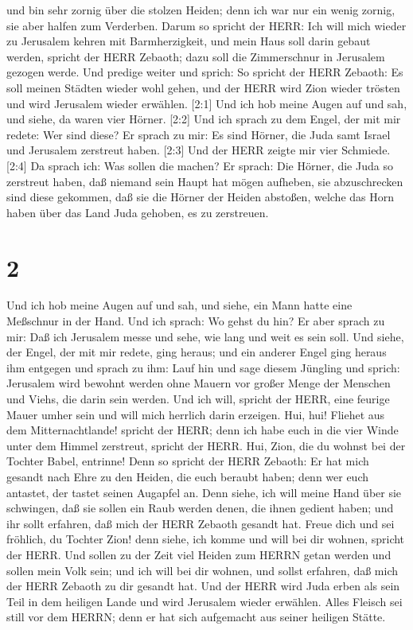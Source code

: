  und bin sehr zornig über die stolzen Heiden; denn ich war
nur ein wenig zornig, sie aber halfen zum Verderben.  Darum
so spricht der HERR: Ich will mich wieder zu Jerusalem kehren mit
Barmherzigkeit, und mein Haus soll darin gebaut werden, spricht der HERR
Zebaoth; dazu soll die Zimmerschnur in Jerusalem gezogen werde.
 Und predige weiter und sprich: So spricht der HERR
Zebaoth: Es soll meinen Städten wieder wohl gehen, und der HERR wird
Zion wieder trösten und wird Jerusalem wieder erwählen. 
{[}2:1{]} Und ich hob meine Augen auf und sah, und siehe, da waren vier
Hörner.  {[}2:2{]} Und ich sprach zu dem Engel, der mit mir
redete: Wer sind diese? Er sprach zu mir: Es sind Hörner, die Juda samt
Israel und Jerusalem zerstreut haben.  {[}2:3{]} Und der
HERR zeigte mir vier Schmiede.  {[}2:4{]} Da sprach ich:
Was sollen die machen? Er sprach: Die Hörner, die Juda so zerstreut
haben, daß niemand sein Haupt hat mögen aufheben, sie abzuschrecken sind
diese gekommen, daß sie die Hörner der Heiden abstoßen, welche das Horn
haben über das Land Juda gehoben, es zu zerstreuen.

\hypertarget{section-1}{%
\section{2}\label{section-1}}

 Und ich hob meine Augen auf und sah, und siehe, ein Mann
hatte eine Meßschnur in der Hand.  Und ich sprach: Wo gehst
du hin? Er aber sprach zu mir: Daß ich Jerusalem messe und sehe, wie
lang und weit es sein soll.  Und siehe, der Engel, der mit
mir redete, ging heraus; und ein anderer Engel ging heraus ihm entgegen
 und sprach zu ihm: Lauf hin und sage diesem Jüngling und
sprich: Jerusalem wird bewohnt werden ohne Mauern vor großer Menge der
Menschen und Viehs, die darin sein werden.  Und ich will,
spricht der HERR, eine feurige Mauer umher sein und will mich herrlich
darin erzeigen.  Hui, hui! Fliehet aus dem Mitternachtlande!
spricht der HERR; denn ich habe euch in die vier Winde unter dem Himmel
zerstreut, spricht der HERR.  Hui, Zion, die du wohnst bei
der Tochter Babel, entrinne!  Denn so spricht der HERR
Zebaoth: Er hat mich gesandt nach Ehre zu den Heiden, die euch beraubt
haben; denn wer euch antastet, der tastet seinen Augapfel an.
 Denn siehe, ich will meine Hand über sie schwingen, daß sie
sollen ein Raub werden denen, die ihnen gedient haben; und ihr sollt
erfahren, daß mich der HERR Zebaoth gesandt hat.  Freue
dich und sei fröhlich, du Tochter Zion! denn siehe, ich komme und will
bei dir wohnen, spricht der HERR.  Und sollen zu der Zeit
viel Heiden zum HERRN getan werden und sollen mein Volk sein; und ich
will bei dir wohnen, und sollst erfahren, daß mich der HERR Zebaoth zu
dir gesandt hat.  Und der HERR wird Juda erben als sein
Teil in dem heiligen Lande und wird Jerusalem wieder erwählen.
 Alles Fleisch sei still vor dem HERRN; denn er hat sich
aufgemacht aus seiner heiligen Stätte.

